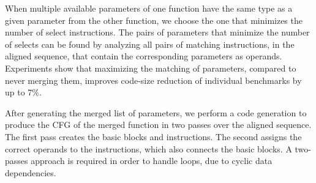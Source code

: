 When multiple available parameters of one function have the same type as a given
parameter from the other function, we choose the one that minimizes the number
of select instructions.
The pairs of parameters that minimize the number of selects can be found by
analyzing all pairs of matching instructions, in the aligned sequence, that
contain the corresponding parameters as operands.
Experiments show that maximizing the matching of parameters, compared to never
merging them, improves code-size reduction of individual benchmarks by up to 7\%.



After generating the merged list of parameters, we perform a code generation
to produce the CFG of the merged function in two passes over the aligned
sequence.
The first pass creates the basic blocks and instructions.
The second assigns the correct operands to the instructions, which also connects
the basic blocks.
A two-passes approach is required in order to handle loops, due to cyclic data
dependencies.

